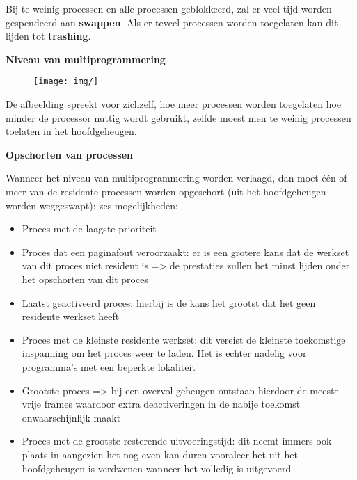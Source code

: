 Bij te weinig processen en alle processen geblokkeerd, zal er veel tijd worden gespendeerd aan \textbf{swappen}. Als er teveel processen worden toegelaten kan dit lijden tot \textbf{trashing}.

\textbf{Niveau van multiprogrammering}


\begin{figure}[htp]
    \centering
            \texttt{[image: img/]}
        \caption{}
    \label{fig:}
\end{figure}

De afbeelding spreekt voor zichzelf, hoe meer processen worden toegelaten hoe minder de processor nuttig wordt gebruikt, zelfde moest men te weinig processen toelaten in het hoofdgeheugen.


\textbf{Opschorten van processen}

Wanneer het niveau van multiprogrammering worden verlaagd, dan moet één of meer van de residente processen worden opgeschort (uit het hoofdgeheugen worden weggeswapt); zes mogelijkheden:

\begin{itemize}
\item Proces met de laagste prioriteit
\item Proces dat een paginafout veroorzaakt: er is een grotere kans dat de werkset van dit proces niet resident is => de prestaties zullen het minst lijden onder het opschorten van dit proces
\item Laatst geactiveerd proces: hierbij is de kans het grootst dat het geen residente werkset heeft
\item Proces met de kleinste residente werkset: dit vereist de kleinste toekomstige inspanning om het proces weer te laden. Het is echter nadelig voor programma's met een beperkte lokaliteit
\item Grootste proces => bij een overvol geheugen ontstaan hierdoor de meeste vrije frames waardoor extra deactiveringen in de nabije toekomst onwaarschijnlijk maakt
\item Proces met de grootste resterende uitvoeringstijd: dit neemt immers ook plaats in aangezien het nog even kan duren vooraleer het uit het hoofdgeheugen is verdwenen wanneer het volledig is uitgevoerd
\end{itemize}



